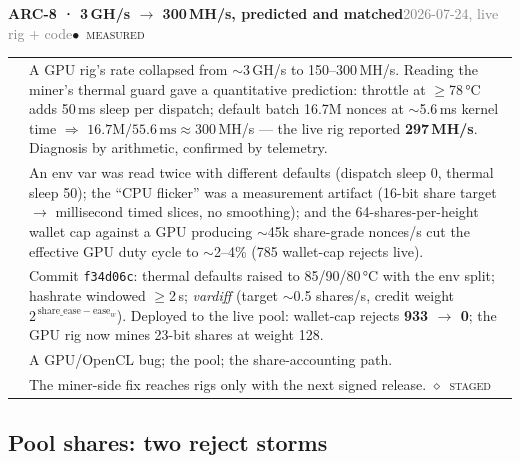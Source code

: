 \documentclass[10pt,a4paper]{article}
\makeatletter
\newcommand{\stM}{\textcolor{sigilcyan}{$\bullet$}~{\scriptsize\textcolor{sigilcyan}{\textsc{measured}}}}
\newcommand{\stG}{\textcolor{sigilviolet}{$\diamond$}~{\scriptsize\textcolor{sigilviolet}{\textsc{staged}}}}
\newcommand{\measured}[1]{\textcolor{sigilcyan}{\textbf{#1}}}
\newcommand{\frow}[2]{{\footnotesize\textcolor{gray}{\textsc{#1}}}\;&\small #2\\}
\newenvironment{mentry}[4]{%
\begin{tcolorbox}[enhanced,breakable,colback=white,colframe=slate,boxrule=0.6pt,arc=2pt,
  left=8pt,right=8pt,top=6pt,bottom=6pt,
  borderline west={3pt}{0pt}{sigilcyan!70!slate}]
{\small\textbf{#1 · #2}\hfill{\footnotesize\textcolor{gray}{#3}}\quad#4}\\[4pt]
\begin{tabular}{@{}>{\raggedleft\arraybackslash}p{1.8cm}p{13.2cm}@{}}
}{%
\end{tabular}
\end{tcolorbox}\vspace{2pt}}
\makeatother
\begin{document}
\begin{mentry}{ARC-8}{3\,GH/s $\to$ 300\,MH/s, predicted and matched}{2026-07-24, live rig + code}{\stM}
\frow{measured}{A GPU rig's rate collapsed from $\sim$3\,GH/s to 150--300\,MH/s. Reading
the miner's thermal guard gave a quantitative prediction: throttle at $\ge$78\,°C adds
50\,ms sleep per dispatch; default batch 16.7M nonces at $\sim$5.6\,ms kernel time
$\Rightarrow$ $16.7\mathrm{M}/55.6\,\mathrm{ms} \approx 300$\,MH/s --- the live rig
reported \measured{297\,MH/s}. Diagnosis by arithmetic, confirmed by telemetry.}
\frow{secondary}{An env var was read twice with different defaults (dispatch sleep 0,
thermal sleep 50); the ``CPU flicker'' was a measurement artifact (16-bit share target
$\to$ millisecond timed slices, no smoothing); and the 64-shares-per-height wallet cap
against a GPU producing $\sim$45k share-grade nonces/s cut the effective GPU duty cycle to
$\sim$2--4\% (785 wallet-cap rejects live).}
\frow{fix}{Commit \texttt{f34d06c}: thermal defaults raised to 85/90/80\,°C with the env
split; hashrate windowed $\ge$2\,s; \emph{vardiff} (target $\sim$0.5 shares/s, credit
weight $2^{\,\mathrm{share\_ease}-\mathrm{ease}_w}$). Deployed to the live pool: wallet-cap
rejects \measured{933 $\to$ 0}; the GPU rig now mines 23-bit shares at weight 128.}
\frow{ruled out}{A GPU/OpenCL bug; the pool; the share-accounting path.}
\frow{open}{The miner-side fix reaches rigs only with the next signed release. \stG}
\end{mentry}

\subsection{Pool shares: two reject storms}
\end{document}
